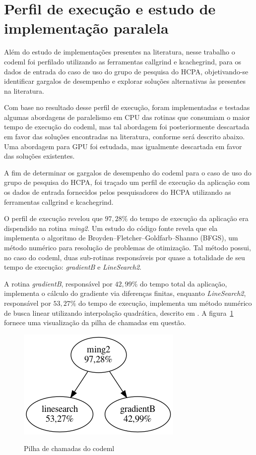 \documentclass[cic,tc]{iiufrgs}
\begin{document}
\section{Perfil de execução e estudo de implementação paralela}
\label{subsec:codemlpar}

Além do estudo de implementações presentes na literatura, nesse trabalho o
codeml foi perfilado utilizando as ferramentas callgrind e
kcachegrind,\cite{weidendorfer2008sequential} para os dados de entrada do caso
de uso do grupo de pesquisa do HCPA, objetivando-se identificar gargalos de
desempenho e explorar soluções alternativas às presentes na literatura.

Com base no resultado desse perfil de execução, foram implementadas e testadas
algumas abordagens de paralelismo em CPU das rotinas que consumiam o maior
tempo de execução do codeml, mas tal abordagem foi posteriormente descartada em
favor das soluções encontradas na literatura, conforme será descrito abaixo.
Uma abordagem para GPU foi estudada, mas igualmente descartada em favor das
soluções existentes.

A fim de determinar os gargalos de desempenho do codeml para o caso de uso do
grupo de pesquisa do HCPA, foi traçado um perfil de execução da aplicação com
os dados de entrada fornecidos pelos pesquisadores do HCPA utilizando as
ferramentas callgrind e kcachegrind.\cite{weidendorfer2008sequential}

O perfil de execução revelou que $97,28\%$ do tempo de execução da aplicação
era dispendido na rotina \textit{ming2}. Um estudo do código fonte revela que
ela implementa o algoritmo de Broyden–Fletcher–Goldfarb–Shanno (BFGS), um
método numérico para resolução de problemas de otimização. Tal método possui,
no caso do codeml, duas sub-rotinas responsáveis por quase a totalidade de seu
tempo de execução: \textit{gradientB} e \textit{LineSearch2}.

A rotina \textit{gradientB}, responsável por $42,99\%$ do tempo total da
aplicação, implementa o cálculo do gradiente via diferenças finitas, enquanto
\textit{LineSearch2}, responsável por $53,27\%$ do tempo de execução,
implementa um método numérico de busca linear utilizando interpolação
quadrática, descrito em \cite{wolfe1978numerical}. A
figura~\ref{fig:kcachegrind} fornece uma visualização da pilha de chamadas em
questão.

\begin{figure} \caption{Pilha de chamadas do codeml} \begin{center}
\includegraphics[width=0.3\linewidth]{img/kcachegrind.png} \end{center}
 \label{fig:kcachegrind} \end{figure}
\end{document}
